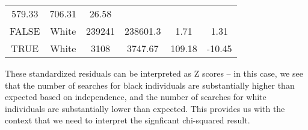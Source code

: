 \documentclass[]{book}
\theoremstyle{definition}
\theoremstyle{definition}
\theoremstyle{definition}
\theoremstyle{remark}
\begin{document}
\begin{longtable}[]{@{}cccccc@{}}
\begin{minipage}[t]{0.13\columnwidth}
579.33\strut
\end{minipage} & \begin{minipage}[t]{0.14\columnwidth}\centering\strut
706.31\strut
\end{minipage} & \begin{minipage}[t]{0.09\columnwidth}\centering\strut
26.58\strut
\end{minipage}\tabularnewline
\begin{minipage}[t]{0.13\columnwidth}\centering\strut
FALSE\strut
\end{minipage} & \begin{minipage}[t]{0.16\columnwidth}\centering\strut
White\strut
\end{minipage} & \begin{minipage}[t]{0.10\columnwidth}\centering\strut
239241\strut
\end{minipage} & \begin{minipage}[t]{0.13\columnwidth}\centering\strut
238601.3\strut
\end{minipage} & \begin{minipage}[t]{0.14\columnwidth}\centering\strut
1.71\strut
\end{minipage} & \begin{minipage}[t]{0.09\columnwidth}\centering\strut
1.31\strut
\end{minipage}\tabularnewline
\begin{minipage}[t]{0.13\columnwidth}\centering\strut
TRUE\strut
\end{minipage} & \begin{minipage}[t]{0.16\columnwidth}\centering\strut
White\strut
\end{minipage} & \begin{minipage}[t]{0.10\columnwidth}\centering\strut
3108\strut
\end{minipage} & \begin{minipage}[t]{0.13\columnwidth}\centering\strut
3747.67\strut
\end{minipage} & \begin{minipage}[t]{0.14\columnwidth}\centering\strut
109.18\strut
\end{minipage} & \begin{minipage}[t]{0.09\columnwidth}\centering\strut
-10.45\strut
\end{minipage}\tabularnewline
\bottomrule
\end{longtable}

These standardized residuals can be interpreted as Z scores -- in this
case, we see that the number of searches for black individuals are
substantially higher than expected based on independence, and the number
of searches for white individuals are substantially lower than expected.
This provides us with the context that we need to interpret the
signficant chi-squared result.
\end{document}
